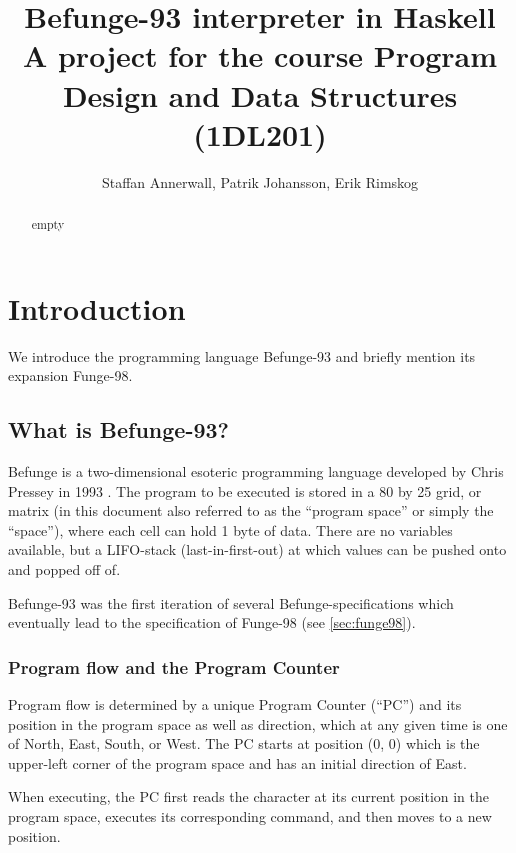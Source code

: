 \documentclass[12pt, a4paper]{article}
\title{Befunge-93 interpreter in Haskell\\
\vspace{5pt}
\small{A project for the course Program Design and Data Structures (1DL201)}}
\author{Staffan Annerwall, Patrik Johansson, Erik Rimskog}
\begin{document}
\maketitle

\begin{abstract}
empty
\end{abstract}

\newpage

\tableofcontents

\vspace{36pt}

\section{Introduction}
We introduce the programming language Befunge-93 and briefly mention its expansion Funge-98.
\label{sec:intro}

\subsection{What is Befunge-93?}
\label{sec:whatis}

Befunge is a two-dimensional esoteric programming language developed by Chris Pressey in 1993 \cite{esolangs}. The program to be executed is stored in a 80 by 25 grid, or matrix (in this document also referred to as the “program space” or simply the “space”), where each cell can hold 1 byte of data. There are no variables available, but a LIFO-stack (last-in-first-out) at which values can be pushed onto and popped off of.

Befunge-93 was the first iteration of several Befunge-specifications which eventually lead to the specification of Funge-98 (see \ref{sec:funge98}).

\subsubsection{Program flow and the Program Counter}
\label{sec:pc}

Program flow is determined by a unique Program Counter (“PC”) and its position in the program space as well as direction, which at any given time is one of North, East, South, or West. The PC starts at position (0, 0) which is the upper-left corner of the program space and has an initial direction of East.

When executing, the PC first reads the character at its current position in the program space, executes its corresponding command, and then moves to a new position.
\end{document}
